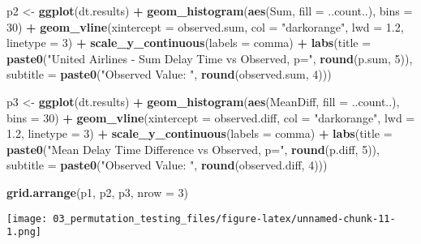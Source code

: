\documentclass[
  12pt,
]{report}
\newenvironment{Shaded}{\begin{snugshade}}{\end{snugshade}}
\newcommand{\DataTypeTok}[1]{\textcolor[rgb]{0.13,0.29,0.53}{#1}}
\newcommand{\DecValTok}[1]{\textcolor[rgb]{0.00,0.00,0.81}{#1}}
\newcommand{\FloatTok}[1]{\textcolor[rgb]{0.00,0.00,0.81}{#1}}
\newcommand{\KeywordTok}[1]{\textcolor[rgb]{0.13,0.29,0.53}{\textbf{#1}}}
\newcommand{\NormalTok}[1]{#1}
\newcommand{\OperatorTok}[1]{\textcolor[rgb]{0.81,0.36,0.00}{\textbf{#1}}}
\newcommand{\StringTok}[1]{\textcolor[rgb]{0.31,0.60,0.02}{#1}}
\begin{document}
\begin{Shaded}
\begin{Highlighting}[]
\NormalTok{p2 <-}\StringTok{ }\KeywordTok{ggplot}\NormalTok{(dt.results) }\OperatorTok{+}
\StringTok{   }\KeywordTok{geom_histogram}\NormalTok{(}\KeywordTok{aes}\NormalTok{(Sum, }\DataTypeTok{fill =}\NormalTok{ ..count..), }\DataTypeTok{bins =} \DecValTok{30}\NormalTok{) }\OperatorTok{+}
\StringTok{   }\KeywordTok{geom_vline}\NormalTok{(}\DataTypeTok{xintercept =}\NormalTok{ observed.sum, }\DataTypeTok{col =} \StringTok{"darkorange"}\NormalTok{, }\DataTypeTok{lwd =} \FloatTok{1.2}\NormalTok{, }\DataTypeTok{linetype =} \DecValTok{3}\NormalTok{) }\OperatorTok{+}
\StringTok{   }\KeywordTok{scale_y_continuous}\NormalTok{(}\DataTypeTok{labels =}\NormalTok{ comma) }\OperatorTok{+}
\StringTok{   }\KeywordTok{labs}\NormalTok{(}\DataTypeTok{title =} \KeywordTok{paste0}\NormalTok{(}\StringTok{"United Airlines - Sum Delay Time vs Observed, p="}\NormalTok{, }\KeywordTok{round}\NormalTok{(p.sum, }\DecValTok{5}\NormalTok{)), }
        \DataTypeTok{subtitle =} \KeywordTok{paste0}\NormalTok{(}\StringTok{"Observed Value: "}\NormalTok{, }\KeywordTok{round}\NormalTok{(observed.sum, }\DecValTok{4}\NormalTok{)))}

\NormalTok{p3 <-}\StringTok{ }\KeywordTok{ggplot}\NormalTok{(dt.results) }\OperatorTok{+}
\StringTok{   }\KeywordTok{geom_histogram}\NormalTok{(}\KeywordTok{aes}\NormalTok{(MeanDiff, }\DataTypeTok{fill =}\NormalTok{ ..count..), }\DataTypeTok{bins =} \DecValTok{30}\NormalTok{) }\OperatorTok{+}
\StringTok{   }\KeywordTok{geom_vline}\NormalTok{(}\DataTypeTok{xintercept =}\NormalTok{ observed.diff, }\DataTypeTok{col =} \StringTok{"darkorange"}\NormalTok{, }\DataTypeTok{lwd =} \FloatTok{1.2}\NormalTok{, }\DataTypeTok{linetype =} \DecValTok{3}\NormalTok{) }\OperatorTok{+}
\StringTok{   }\KeywordTok{scale_y_continuous}\NormalTok{(}\DataTypeTok{labels =}\NormalTok{ comma) }\OperatorTok{+}
\StringTok{   }\KeywordTok{labs}\NormalTok{(}\DataTypeTok{title =} \KeywordTok{paste0}\NormalTok{(}\StringTok{"Mean Delay Time Difference vs Observed, p="}\NormalTok{, }\KeywordTok{round}\NormalTok{(p.diff, }\DecValTok{5}\NormalTok{)), }
        \DataTypeTok{subtitle =} \KeywordTok{paste0}\NormalTok{(}\StringTok{"Observed Value: "}\NormalTok{, }\KeywordTok{round}\NormalTok{(observed.diff, }\DecValTok{4}\NormalTok{)))}

\KeywordTok{grid.arrange}\NormalTok{(p1, p2, p3, }\DataTypeTok{nrow =} \DecValTok{3}\NormalTok{)}
\end{Highlighting}
\end{Shaded}

\texttt{[image: 03\_permutation\_testing\_files/figure-latex/unnamed-chunk-11-1.png]}
\end{document}
